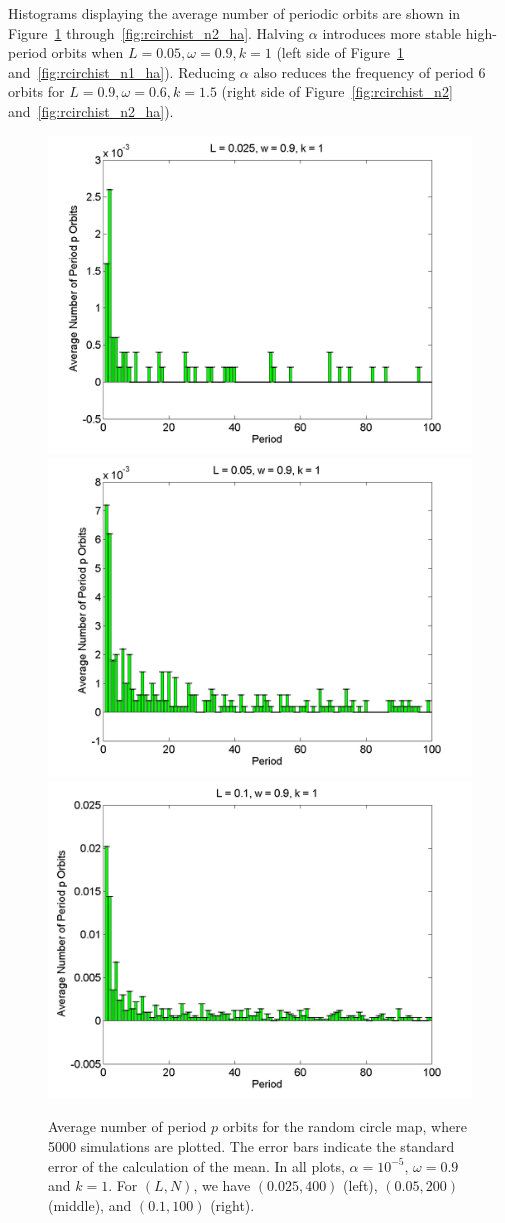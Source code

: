 Histograms displaying the average number of periodic orbits are shown
in Figure~\ref{fig:rcirchist_n1}
through~\ref{fig:rcirchist_n2_ha}. Halving $\alpha$ introduces more
stable high-period orbits when $L=0.05,\omega=0.9,k=1$ (left side of
Figure~\ref{fig:rcirchist_n1} and~\ref{fig:rcirchist_n1_ha}). Reducing
$\alpha$ also reduces the frequency of period 6 orbits for
$L=0.9,\omega=0.6,k=1.5$ (right side of Figure~\ref{fig:rcirchist_n2} and~\ref{fig:rcirchist_n2_ha}).

\begin{figure}[H]\linespread{1}
\caption[Average number of period $p$ orbits for the random circle
map (normal distribution), for $\alpha = 10^{-5}$, $\omega=0.9$ and $k=1$]{Average number of period $p$ orbits for the random circle
map, where 5000 simulations are plotted. The error bars indicate
the standard error of the calculation of the mean. In all plots,
$\alpha = 10^{-5}$, $\omega=0.9$ and $k=1$. For $(L,N)$,
we have $(0.025, 400)$ (left), $(0.05, 200)$
(middle), and $(0.1, 100)$ (right).}\label{fig:rcirchist_n1}
	\begin{center}
\includegraphics[width=.33\textwidth]{figs/rcirc_hist_n_L_0025_w_09_k_1_sims_5000.png}\hfill
\includegraphics[width=.33\textwidth]{figs/rcirc_hist_n_L_005_w_09_k_1_sims_5000.png}\hfill
\includegraphics[width=.33\textwidth]{figs/rcirc_hist_n_L_01_w_09_k_1_sims_5000.png}
	\end{center}
\end{figure}


